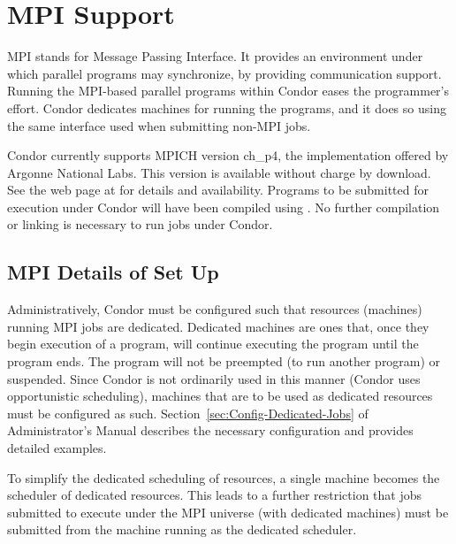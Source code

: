 \section{\label{sec:MPI}MPI Support}
MPI stands for Message Passing Interface.
It provides an environment under which parallel programs
may synchronize, 
by providing communication support.
Running the MPI-based parallel programs within Condor 
eases the programmer's effort.
Condor dedicates machines for running the programs,
and it does so using the same interface used when submitting
non-MPI jobs.

Condor currently supports MPICH version ch\_p4, the implementation
offered by Argonne National Labs.
This version is available without charge by download.
See the web page at
for details and availability.
Programs to be submitted for execution under Condor will have
been compiled using .
No further compilation or linking is necessary to run jobs
under Condor.

\subsection{\label{sec:MPI-setup}MPI Details of Set Up}

Administratively, Condor must be configured such that resources
(machines) running MPI jobs are dedicated.
Dedicated machines are ones that, once they begin execution of
a program, will continue executing the program until
the program ends.
The program will not be preempted (to run another program) or
suspended.
Since Condor is not ordinarily used in this manner (Condor uses
opportunistic scheduling),
machines that are to be used as dedicated resources
must be configured as such.
Section~\ref{sec:Config-Dedicated-Jobs} of
Administrator's Manual describes the necessary
configuration and provides detailed examples.

To simplify the dedicated scheduling of resources,
a single machine becomes the scheduler of dedicated resources.
This leads to a further restriction that jobs submitted
to execute under the MPI universe (with dedicated machines)
must be
submitted from the machine running as the dedicated scheduler.

